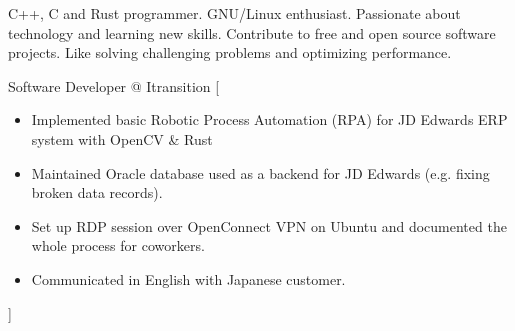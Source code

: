 \documentclass{resume}
\begin{document}
\makeheader


C++, C and Rust programmer. GNU/Linux enthusiast.
Passionate about technology and learning new skills.
Contribute to free and open source software projects.
Like solving challenging problems and optimizing performance.

\begin{experiences}
		{Software Developer @ Itransition}%
		[\begin{itemize}
			\item Implemented basic Robotic Process Automation (RPA) for JD Edwards ERP system with OpenCV \& Rust
			\item Maintained Oracle database used as a backend for JD Edwards (e.g. fixing broken data records).
			\item Set up RDP session over OpenConnect VPN on Ubuntu and documented the whole process for coworkers.
			\item Communicated in English with Japanese customer.
		\end{itemize}]
\end{experiences}

\begin{competences}[10em]
\end{competences}
\end{document}
